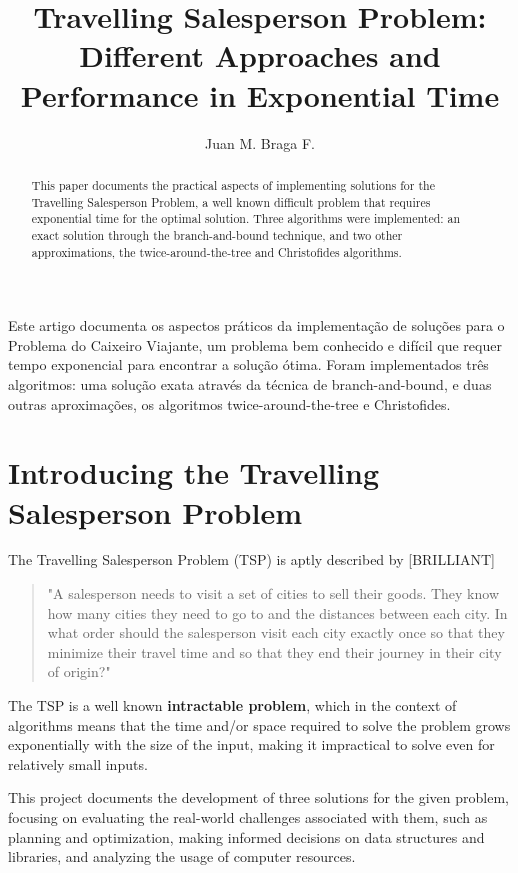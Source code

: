 \documentclass[12pt]{article}
\title{Travelling Salesperson Problem:\\ Different Approaches and Performance in Exponential Time}
\author{Juan M. Braga F.\inst{1}}
\begin{document}
 

\maketitle

\begin{abstract}
  This paper documents the practical aspects of implementing solutions
  for the Travelling Salesperson Problem, a well known difficult problem that requires
  exponential time for the optimal solution. Three algorithms were implemented:
  an exact solution through the branch-and-bound technique, and two other approximations,
  the twice-around-the-tree and Christofides algorithms.
\end{abstract}
     
\begin{resumo} 
  Este artigo documenta os aspectos práticos da implementação de soluções
  para o Problema do Caixeiro Viajante, um problema bem conhecido e difícil que requer
  tempo exponencial para encontrar a solução ótima. Foram implementados três algoritmos:
  uma solução exata através da técnica de branch-and-bound, e duas outras aproximações,
  os algoritmos twice-around-the-tree e Christofides.
\end{resumo}


\section{Introducing the Travelling Salesperson Problem}

The Travelling Salesperson Problem (TSP) is aptly described by [BRILLIANT] 

\begin{quote}
  "A salesperson needs to visit a set of cities to sell their goods. They know how 
  many cities they need to go to and the distances between each city. In what order 
  should the salesperson visit each city exactly once so that they minimize their 
  travel time and so that they end their journey in their city of origin?"
\end{quote}

The TSP is a well known \textbf{intractable problem}, which in the context of 
algorithms means that the time and/or space required to solve the problem grows 
exponentially with the size of the input, making it impractical to solve even for 
relatively small inputs.

This project documents the development of three solutions for the given problem, 
focusing on evaluating the real-world challenges associated with them, such as planning and 
optimization, making informed decisions on data structures and libraries, and 
analyzing the usage of computer resources.
\end{document}
